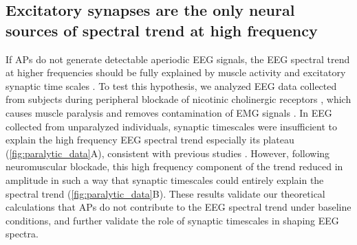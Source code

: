 \subsection{Excitatory synapses are the only neural sources of spectral trend at high frequency}
If APs do not generate detectable aperiodic EEG signals, the EEG spectral trend at higher frequencies should be fully explained by muscle activity \cite{Muthukumaraswamy2013} and excitatory synaptic time scales \cite{Brake2024, Gao2017}. To test this hypothesis, we analyzed EEG data collected from subjects during peripheral blockade of nicotinic cholinergic receptors \cite{Whitham2007}, which causes muscle paralysis and removes contamination of EMG signals \cite{Whitham2007, Fitzgibbon2013}. In EEG collected from unparalyzed individuals, synaptic timescales were insufficient to explain the high frequency EEG spectral trend especially its plateau ({\autoref{fig:paralytic_data}A}), consistent with previous studies \cite{Brake2024}. However, following neuromuscular blockade, this high frequency component of the trend reduced in amplitude in such a way that synaptic timescales could entirely explain the spectral trend ({\autoref{fig:paralytic_data}B}). These results validate our theoretical calculations that APs do not contribute to the EEG spectral trend under baseline conditions, and further validate the role of synaptic timescales in shaping EEG spectra.

